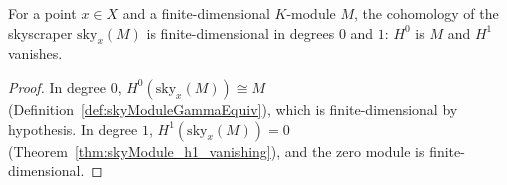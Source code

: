 \begin{theorem}
  \label{thm:moduleFinite_skyModule}
  \leanok
  For a point \(x \in X\) and a finite-dimensional \(K\)-module \(M\), the cohomology of the
  skyscraper \(\mathrm{sky}_x(M)\) is finite-dimensional in degrees \(0\) and \(1\):
  \(H^0\) is \(M\) and \(H^1\) vanishes.
\end{theorem}
\begin{proof}
  \leanok
  In degree \(0\), \(H^0(\mathrm{sky}_x(M)) \cong M\) (Definition~\ref{def:skyModuleGammaEquiv}),
  which is finite-dimensional by hypothesis. In degree \(1\),
  \(H^1(\mathrm{sky}_x(M)) = 0\) (Theorem~\ref{thm:skyModule_h1_vanishing}), and the zero module
  is finite-dimensional.
\end{proof}

